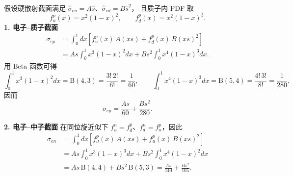 \begin{example}[截面计算练习]
    假设硬散射截面满足 $\hat{\sigma}_{eu}=A\hat s$、$\hat{\sigma}_{ed}=B\hat s^2$，
    且质子内 PDF 取
    \begin{equation}
        f_u^p(x)=x^2(1-x)^2,\qquad f_d^p(x)=x^2(1-x)^3.
    \end{equation}
    \textbf{1. 电子--质子截面}
    \begin{align}
        \sigma_{ep}
        &= \int_0^1 dx\left[f_u^p(x)\,A(xs)+f_d^p(x)\,B(xs)^2\right] \nonumber\\
        &= As\int_0^1 x^3(1-x)^2dx + Bs^2\int_0^1 x^4(1-x)^3dx.
    \end{align}
    用 Beta 函数可得
    \begin{equation}
        \int_0^1 x^3(1-x)^2 dx=\mathrm{B}(4,3)=\frac{3!\,2!}{6!}=\frac{1}{60},\qquad
        \int_0^1 x^4(1-x)^3 dx=\mathrm{B}(5,4)=\frac{4!\,3!}{8!}=\frac{1}{280},
    \end{equation}
    因而
    \begin{equation}
        \sigma_{ep}=\frac{As}{60}+\frac{Bs^2}{280}.
    \end{equation}

    \textbf{2. 电子--中子截面}
    在同位旋近似下 $f_u^n=f_d^p$、$f_d^n=f_u^p$，因此
    \begin{align}
        \sigma_{en}
        &= \int_0^1 dx\left[f_d^p(x)\,A(xs)+f_u^p(x)\,B(xs)^2\right]\nonumber\\
        &= As\int_0^1 x^3(1-x)^3dx + Bs^2\int_0^1 x^4(1-x)^2dx \nonumber\\
        &= As\,\mathrm{B}(4,4)+Bs^2\,\mathrm{B}(5,3)
        =\frac{As}{140}+\frac{Bs^2}{105}.
    \end{align}
\end{example}

